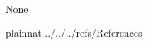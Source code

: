 \documentclass[12pt, titlepage]{article}
\begin{document}
None

\newpage


 {plainnat}
 {../../../refs/References}








% 

\end{document}
